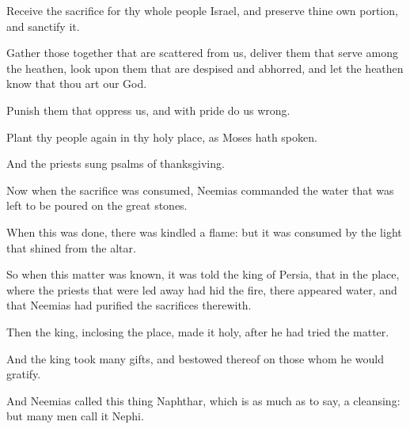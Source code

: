 {\par }{\PP {}Receive the sacrifice for thy whole people Israel, and preserve thine own portion, and sanctify it.
\par }{\PP {}Gather those together that are scattered from us, deliver them that serve among the heathen, look upon them that are despised and abhorred, and let the heathen know that thou art our God.
\par }{\PP {}Punish them that oppress us, and with pride do us wrong.
\par }{\PP {}Plant thy people again in thy holy place, as Moses hath spoken.
\par }{\PP {}And the priests sung psalms of thanksgiving.
\par }{\PP {}Now when the sacrifice was consumed, Neemias commanded the water that was left to be poured on the great stones.
\par }{\PP {}When this was done, there was kindled a flame: but it was consumed by the light that shined from the altar.
\par }{\PP {}So when this matter was known, it was told the king of Persia, that in the place, where the priests that were led away had hid the fire, there appeared water, and that Neemias had purified the sacrifices therewith.
\par }{\PP {}Then the king, inclosing the place, made it holy, after he had tried the matter.
\par }{\PP {}And the king took many gifts, and bestowed thereof on those whom he would gratify.
\par }{\PP {}And Neemias called this thing Naphthar, which is as much as to say, a cleansing: but many men call it Nephi.

}
